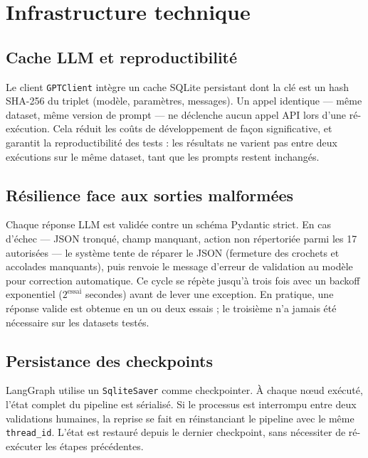 \documentclass[12pt,a4paper]{article}
\begin{document}
\section{Infrastructure technique}

\subsection{Cache LLM et reproductibilité}

Le client \texttt{GPTClient} intègre un cache SQLite persistant dont la clé est un
hash SHA-256 du triplet (modèle, paramètres, messages). Un appel identique --- même
dataset, même version de prompt --- ne déclenche aucun appel API lors d'une ré-exécution.
Cela réduit les coûts de développement de façon significative, et garantit la
reproductibilité des tests : les résultats ne varient pas entre deux exécutions sur le
même dataset, tant que les prompts restent inchangés.

\subsection{Résilience face aux sorties malformées}

Chaque réponse LLM est validée contre un schéma Pydantic strict. En cas d'échec ---
JSON tronqué, champ manquant, action non répertoriée parmi les 17 autorisées ---
le système tente de réparer le JSON (fermeture des crochets et accolades manquants),
puis renvoie le message d'erreur de validation au modèle pour correction automatique.
Ce cycle se répète jusqu'à trois fois avec un backoff exponentiel ($2^{\text{essai}}$
secondes) avant de lever une exception. En pratique, une réponse valide est obtenue
en un ou deux essais ; le troisième n'a jamais été nécessaire sur les datasets testés.

\subsection{Persistance des checkpoints}

LangGraph utilise un \texttt{SqliteSaver} comme checkpointer. À chaque nœud exécuté,
l'état complet du pipeline est sérialisé. Si le processus est interrompu entre deux
validations humaines, la reprise se fait en réinstanciant le pipeline avec le même
\texttt{thread\_id}. L'état est restauré depuis le dernier checkpoint, sans nécessiter
de ré-exécuter les étapes précédentes.
\end{document}
